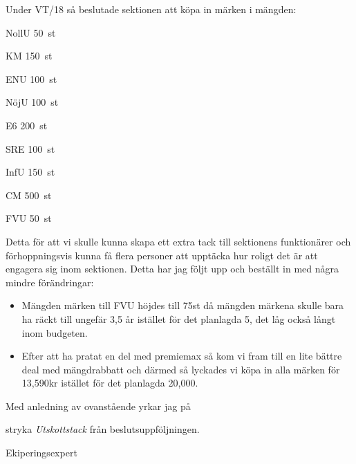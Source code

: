 \documentclass[../_main/handlingar.tex]{subfiles}
\begin{document}

Under VT/18 så beslutade sektionen att köpa in märken i mängden:

\begin{emptylist}
    \item NollU \SI{50}{st}
    \item KM \SI{150}{st}
    \item ENU \SI{100}{st}
    \item NöjU \SI{100}{st}
    \item E6 \SI{200}{st}
    \item SRE \SI{100}{st}
    \item InfU \SI{150}{st}
    \item CM \SI{500}{st}
    \item FVU \SI{50}{st}
\end{emptylist}

Detta för att vi skulle kunna skapa ett extra tack till sektionens funktionärer och förhoppningsvis kunna få flera personer att upptäcka hur roligt det är att engagera sig inom sektionen. Detta har jag följt upp och beställt in med några mindre förändringar:

\begin{itemize}
    \item Mängden märken till FVU höjdes till 75st då mängden märkena skulle bara ha räckt till ungefär 3,5 år istället för det planlagda 5, det låg också långt inom budgeten.
    \item Efter att ha pratat en del med premiemax så kom vi fram till en lite bättre deal med mängdrabbatt och därmed så lyckades vi köpa in alla märken för 13,590kr istället för det planlagda 20,000.
\end{itemize}

Med anledning av ovanstående yrkar jag på

\begin{attsatser}
    \att stryka \emph{Utskottstack} från beslutsuppföljningen.
\end{attsatser}

\begin{signatures}{1}
    \mvh
    \signature{Henrik Ramström}{Ekiperingsexpert}
\end{signatures}
\end{document}
